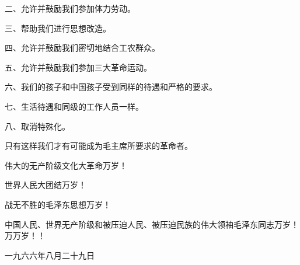 \begin{maonote}
二、允许并鼓励我们参加体力劳动。

三、帮助我们进行思想改造。

四、允许并鼓励我们密切地结合工农群众。

五、允许并鼓励我们参加三大革命运动。

六、我们的孩子和中国孩子受到同样的待遇和严格的要求。

七、生活待遇和同级的工作人员一样。

八、取消特殊化。

只有这样我们才有可能成为毛主席所要求的革命者。

伟大的无产阶级文化大革命万岁！

世界人民大团结万岁！

战无不胜的毛泽东思想万岁！

中国人民、世界无产阶级和被压迫人民、被压迫民族的伟大领袖毛泽东同志万岁！万万岁！！

一九六六年八月二十九日
\end{maonote}
